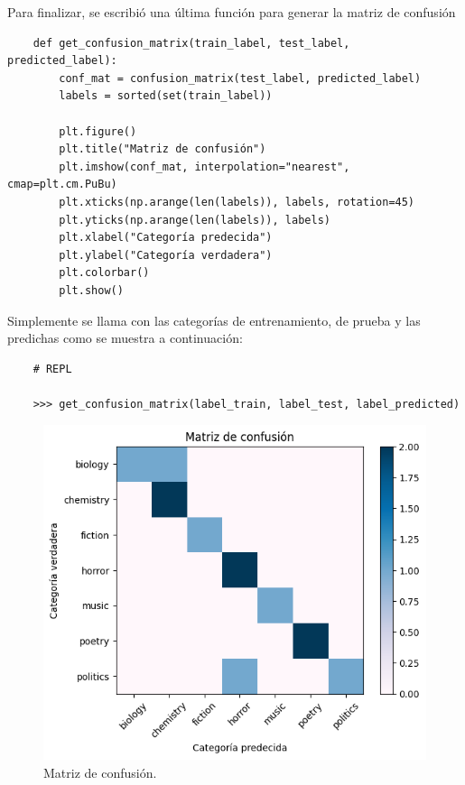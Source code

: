 Para finalizar, se escribió una última función para generar la matriz de confusión
\begin{verbatim}
    def get_confusion_matrix(train_label, test_label, predicted_label):
        conf_mat = confusion_matrix(test_label, predicted_label)
        labels = sorted(set(train_label))

        plt.figure()
        plt.title("Matriz de confusión")
        plt.imshow(conf_mat, interpolation="nearest", cmap=plt.cm.PuBu)
        plt.xticks(np.arange(len(labels)), labels, rotation=45)
        plt.yticks(np.arange(len(labels)), labels)
        plt.xlabel("Categoría predecida")
        plt.ylabel("Categoría verdadera")
        plt.colorbar()
        plt.show()
\end{verbatim}

Simplemente se llama con las categorías de entrenamiento, de prueba y las predichas como se muestra a continuación:
\begin{verbatim}
    # REPL

    >>> get_confusion_matrix(label_train, label_test, label_predicted)
\end{verbatim}

\begin{figure}[ht!]
    \centering
    \includegraphics[scale=0.8]{../figures/confusion_matrix.png}
    \caption{Matriz de confusión.}
    \label{fig:confusion_matrix}
\end{figure}

